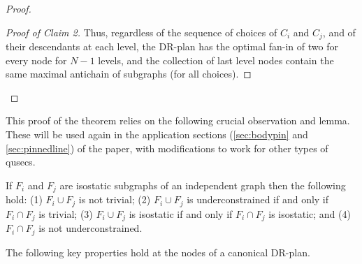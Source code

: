 \begin{proof}
\begin{proof}[Proof of Claim 2]
        Thus, regardless of the sequence of choices of $C_i$ and $C_j$, and of their descendants at each level, the DR-plan has the optimal fan-in of two for every node for $N-1$ levels, and the collection of last level nodes contain the same maximal antichain of subgraphs (for all choices).
    \end{proof}
\end{proof}

This proof of the theorem relies on the following crucial observation and lemma. These will be used again in the application sections (\ref{sec:bodypin} and \ref{sec:pinnedline}) of the paper, with modifications to work for other types of qusecs.

\begin{observation*}
\label{lemma:union_intersection}
    If $F_i$ and $F_j$ are isostatic subgraphs of an independent graph then the following hold:
    (1) $F_i\cup F_j$ is not trivial;
    (2) $F_i\cup F_j$ is underconstrained if and only if $F_i\cap F_j$ is trivial;
    (3) $F_i\cup F_j$ is isostatic if and only if $F_i\cap F_j$ is isostatic; and
    (4) $F_i\cap F_j$ is not underconstrained.
\end{observation*}

The following key properties hold at the nodes of a canonical DR-plan.

